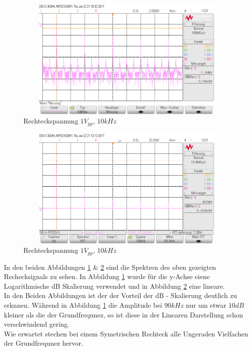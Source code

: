 \begin{figure}[H]
 \begin{center}
  \includegraphics[height=6cm,width=12cm]{OsziBilder/bsp2_Hanning_dB.png}
 \end{center}
 \caption{Rechteckspannung $1V_{pp}$, $10kHz$}\label{bsp2_dB}
\end{figure}
\noindent

\begin{figure}[H]
 \begin{center}
  \includegraphics[height=6cm,width=12cm]{OsziBilder/bsp2_Hanning_RMS_Cursor.png}
 \end{center}
 \caption{Rechteckspannung $1V_{pp}$, $10kHz$}\label{bsp2_rms}
\end{figure}
\noindent
In den beiden Abbildungen \ref{bsp2_dB} \& \ref{bsp2_rms} sind die Spektren des oben gezeigten Rechecksignals zu sehen. In Abbildung \ref{bsp2_dB} wurde f\"ur die y-Achse eiene Logarithmische dB Skalierung verwendet und in Abbildung \ref{bsp2_rms} eine lineare. \\
In den Beiden Abbildungen ist der der Vorteil der dB - Skalierung deutlich zu erknnen. W\"ahrend in Abbildung \ref{bsp2_dB} die Amplitude bei $90kHz$ nur um etwar $10dB$ kleiner als die der Grundfrequnez, so ist diese in der Linearen Darstellung schon verschwindend gering. \\
Wie erwartet stechen bei einem Symetrischen Rechteck alle Ungeraden Vielfachen der Grundfrequnez hervor.

